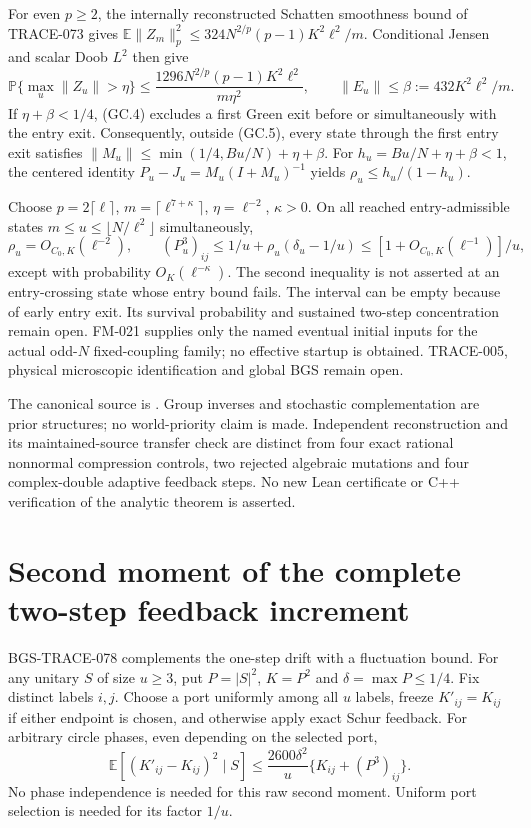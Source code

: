 For even $p\ge2$, the internally reconstructed Schatten smoothness bound
of TRACE-073 gives
$\mathbb E\|Z_m\|_p^2\le324N^{2/p}(p-1)K^2\ell^2/m$.
Conditional Jensen and scalar Doob $L^2$ then give
\[
 \mathbb P\{\max_u\|Z_u\|>\eta\}
 \le\frac{1296N^{2/p}(p-1)K^2\ell^2}{m\eta^2},\qquad
 \|E_u\|\le\beta:=432K^2\ell^2/m.               \tag{GC.5}
\]
If $\eta+\beta<1/4$, (GC.4) excludes a first Green exit before or
simultaneously with the entry exit. Consequently, outside (GC.5),
every state through the first entry exit satisfies
$\|M_u\|\le\min(1/4,Bu/N)+\eta+\beta$.
For $h_u=Bu/N+\eta+\beta<1$, the centered identity
$P_u-J_u=M_u(I+M_u)^{-1}$ yields
$\rho_u\le h_u/(1-h_u)$.

Choose $p=2\lceil\ell\rceil$, $m=\lceil\ell^{7+\kappa}\rceil$,
$\eta=\ell^{-2}$, $\kappa>0$. On all reached entry-admissible states
$m\le u\le\lfloor N/\ell^2\rfloor$ simultaneously,
\[
 \rho_u=O_{C_0,K}(\ell^{-2}),\qquad
 (P_u^3)_{ij}\le1/u+\rho_u(\delta_u-1/u)
                \le[1+O_{C_0,K}(\ell^{-1})]/u,              \tag{GC.6}
\]
except with probability $O_K(\ell^{-\kappa})$. The second inequality
is not asserted at an entry-crossing state whose entry bound fails.
The interval can be empty because of early entry exit. Its survival
probability and sustained two-step concentration remain open.
FM-021 supplies only the named eventual initial inputs for the actual
odd-$N$ fixed-coupling family; no effective startup is obtained.
TRACE-005, physical microscopic identification and global BGS remain open.

The canonical source is
.
Group inverses and stochastic complementation are prior structures;
no world-priority claim is made. Independent reconstruction and its
maintained-source transfer check are distinct from four exact rational
nonnormal compression controls, two rejected algebraic mutations and
four complex-double adaptive feedback steps. No new Lean certificate
or C++ verification of the analytic theorem is asserted.

\section{Second moment of the complete two-step feedback increment}
\label{sec:two-step-variance-20261013}

BGS-TRACE-078 complements the one-step drift with a fluctuation bound.
For any unitary $S$ of size $u\ge3$, put $P=|S|^2$, $K=P^2$ and
$\delta=\max P\le1/4$. Fix distinct labels $i,j$. Choose a port uniformly
among all $u$ labels, freeze $K'_{ij}=K_{ij}$ if either endpoint is
chosen, and otherwise apply exact Schur feedback. For arbitrary circle
phases, even depending on the selected port,
\[
 \mathbb E[(K'_{ij}-K_{ij})^2\mid S]
       \le\frac{2600\delta^2}{u}\{K_{ij}+(P^3)_{ij}\}.       \tag{SV.1}
\]
No phase independence is needed for this raw second moment. Uniform port
selection is needed for its factor $1/u$.

